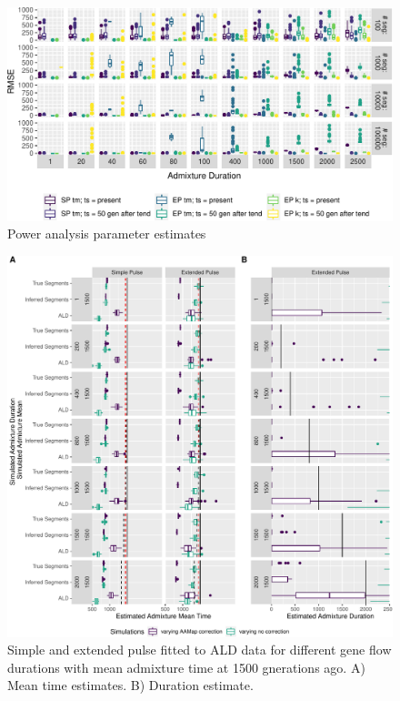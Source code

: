 \documentclass[11pt]{article}
\begin{document}
\begin{figure}
\centering
\includegraphics{ATE_Revisions_files/figure-latex/figR1_error_ests-1.pdf}
\caption{\label{fig:figR1_error_ests} Power analysis parameter estimates}
\end{figure}

\begin{figure}
\centering
\includegraphics{ATE_Revisions_files/figure-latex/figResult3_1_Supplement-1.pdf}
\caption{\label{fig:figResult3_1_Supplement} Simple and extended pulse fitted to ALD data for different gene flow durations with mean admixture time at 1500 gnerations ago. A) Mean time estimates. B) Duration estimate.}
\end{figure}
\end{document}
